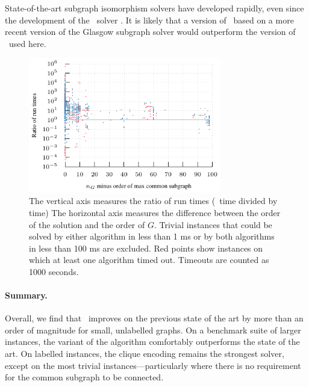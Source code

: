 State-of-the-art subgraph isomorphism solvers have developed rapidly, even since the
development of the \kDown\ solver \cite{DBLP:conf/gg/McCreeshP020}.  It is likely that
a version of \kDown\ based on a more recent version of the Glasgow subgraph solver
would outperform the version of \kDown\ used here.

\begin{figure}[h!]
    \centering
    \includegraphics*[width=0.75\textwidth]{14-mcsplit-i-undirected/plots-based-on-ijcai-paper/more-analysis/plots/sip-runtime-ratio-vs-solution-size}
    \caption{The vertical axis measures the ratio of run times (\kDown\ time divided by \McSplitDown time)
        The horizontal axis measures the difference between the order of the solution and the order of $G$.
        Trivial instances that could be solved by either algorithm in less
        than 1 ms or by both algorithms in less than 100 ms are excluded.  Red points show instances
        on which at least one algorithm timed out. Timeouts are counted as 1000
        seconds.}\label{figure:sip-runtime-ratios}
\end{figure}

\paragraph{Summary.} Overall, we find that \McSplit\ improves on the
previous state of the art by more than an order of magnitude for small,
unlabelled graphs.  On a benchmark suite of larger instances, the
\McSplit{$\downarrow$} variant of the algorithm comfortably outperforms the
state of the art.  On labelled instances, the clique encoding remains the
strongest solver, except on the most trivial instances---particularly where
there is no requirement for the common subgraph to be connected.



